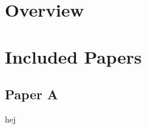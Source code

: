 \documentclass[electronic]{kthesis}
\begin{document}

\part{Overview}





\part{Included Papers}
\chapter{Paper A}
hej
	
	

\renewcommand{\bibname}{References}%

	
\end{document}
